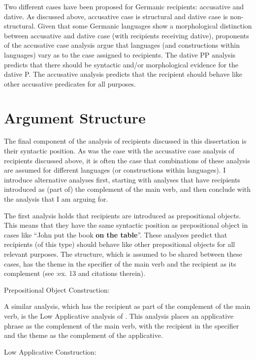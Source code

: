 Two different cases have been proposed for Germanic recipients: accusative and dative. As discussed above, accusative case is structural and dative case is non-structural. Given that some Germanic languages show a morphological distinction between accusative and dative case (with recipients receiving dative), proponents of the accusative case analysis argue that languages (and constructions within languages) vary as to the case assigned to recipients. The dative PP analysis predicts that there should be syntactic and/or morphological evidence for the dative P. The accusative analysis predicts that the recipient should behave like other accusative predicates for all purposes.

\section{Argument Structure}
The final component of the analysis of recipients discussed in this dissertation is their syntactic position. As was the case with the accusative case analysis of recipients discussed above, it is often the case that combinations of these analysis are assumed for different languages (or constructions within languages). I introduce alternative analyses first, starting with analyses that have recipients introduced as (part of) the complement of the main verb, and then conclude with the analysis that I am arguing for.

The first analysis holds that recipients are introduced as prepositional objects. This means that they have the same syntactic position as prepositional object in cases like ``John put the book \textbf{on the table}''. These analyses predict that recipients (of this type) should behave like other prepositional objects for all relevant purposes. The structure, which is assumed to be shared between these cases, has the theme in the specifier of the main verb and the recipient as its complement (see \citealt{Larson.1988}:ex. 13 and citations therein).

\begin{exe}
	\ex Prepositional Object Construction:\label{ex:POC} \\
\end{exe}


A similar analysis, which has the recipient as part of the complement of the main verb, is the Low Applicative analysis of \cite{Pylkkanen.2001}. This analysis places an applicative phrase as the complement of the main verb, with the recipient in the specifier and the theme as the complement of the applicative. 
\begin{exe}
\ex Low Applicative Construction: \\
\end{exe}

